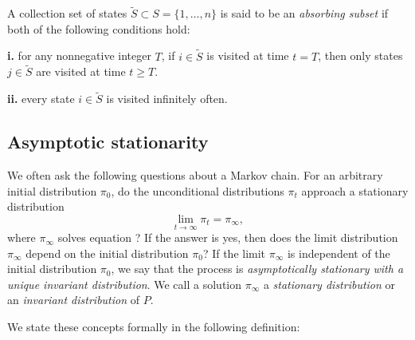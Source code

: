 \medskip
{} A collection set of states $\tilde S \subset S = \{1, \ldots, n\}$ is said to be
an {\it absorbing subset\/} if both of the following conditions hold:
\item{{\bf i.}} for any nonnegative integer $T$,
if $i \in \tilde S$ is visited at time $t=T$, then only states $j \in \tilde S$ are visited at time $t \geq T$.%
\item{{\bf ii.}} every state $i \in \tilde S $ is visited infinitely often.
\enddefinition


\subsection{Asymptotic stationarity}

   We often ask the following questions
about a    Markov chain. For an arbitrary initial distribution
$\pi_0$, do the unconditional distributions
$\pi_t$ approach a stationary distribution
$$ \lim_{t \to \infty} \pi_t = \pi_\infty ,$$
where $\pi_\infty$ solves equation
 ?  If the answer is yes, then does the
limit distribution $\pi_\infty$ depend on the initial distribution
$\pi_0$?  If the limit $\pi_\infty$ is independent of the
initial distribution $\pi_0$, we say that the process is
{\it asymptotically stationary with a unique invariant distribution}.
We call a solution $\pi_\infty$ a {\it stationary
distribution\/} or an {\it invariant distribution\/} of $P$.


  We state these concepts formally in the following definition:

